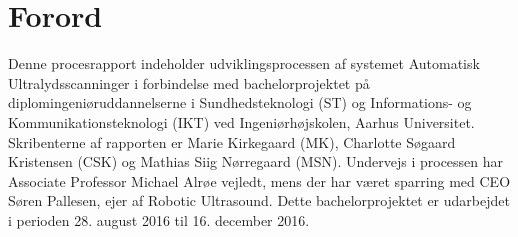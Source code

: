 \chapter{Forord}\label{kapForord}
Denne procesrapport indeholder udviklingsprocessen af systemet Automatisk Ultralydsscanninger i forbindelse med bachelorprojektet på diplomingeniøruddannelserne i Sundhedsteknologi (ST) og Informations- og Kommunikationsteknologi (IKT) ved Ingeniørhøjskolen, Aarhus Universitet. Skribenterne af rapporten er Marie Kirkegaard (MK), Charlotte Søgaard Kristensen (CSK) og Mathias Siig Nørregaard (MSN). Undervejs i processen har Associate Professor Michael Alrøe vejledt, mens der har været sparring med CEO Søren Pallesen, ejer af Robotic Ultrasound. 
Dette bachelorprojektet er udarbejdet i perioden 28. august 2016 til 16. december 2016.
